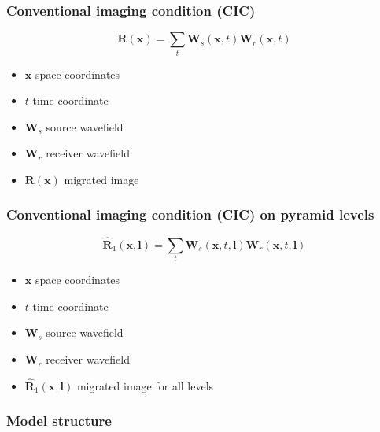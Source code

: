 \begin{frame} \frametitle{Conventional imaging condition (CIC)}

\begin{equation} \label{eqn:cic}
\mathbf{R}(\mathbf{x})=\sum_t {\mathbf{W}_s(\mathbf{x},t)\mathbf{W}_r(\mathbf{x},t)}
\end{equation}

\centering
\begin{itemize}
\item $\mathbf{x}$ space coordinates 
\item $t$ time coordinate 
\item $\mathbf{W}_s$ source wavefield
\item $\mathbf{W}_r$ receiver wavefield
\item $\mathbf{R}(\mathbf{x})$ migrated image 
\end{itemize}

\end{frame}

\begin{frame} \frametitle{Conventional imaging condition (CIC) on pyramid levels}

\begin{equation} \label{eqn:cic}
\hat{\mathbf{R}}_1(\mathbf{x},\mathbf{l})=\sum_t {\mathbf{W}_s(\mathbf{x},t,\mathbf{l})\mathbf{W}_r(\mathbf{x},t,\mathbf{l})}
\end{equation}

\centering
\begin{itemize}
\item $\mathbf{x}$ space coordinates 
\item $t$ time coordinate 
\item $\mathbf{W}_s$ source wavefield
\item $\mathbf{W}_r$ receiver wavefield
\item $\hat{\mathbf{R}}_1(\mathbf{x},\mathbf{l})$ migrated image for all levels
\end{itemize}

\end{frame}




\begin{frame} \frametitle{Model structure}
  \begin{columns}[t]
    \vspace{-0.15in}
    \vspace{-0.15in}
  \end{columns}
\end{frame}


